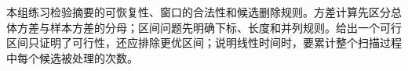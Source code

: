 本组练习检验摘要的可恢复性、窗口的合法性和候选删除规则。方差计算先区分总体方差与样本方差的分母；区间问题先明确下标、长度和并列规则。给出一个可行区间只证明了可行性，还应排除更优区间；说明线性时间时，要累计整个扫描过程中每个候选被处理的次数。
\par\smallskip
